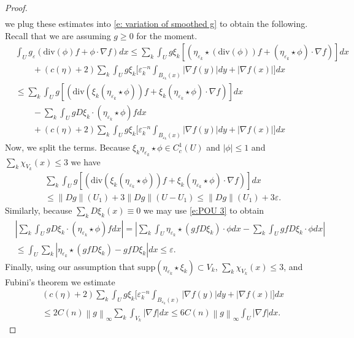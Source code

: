 \documentclass[12pt]{amsart}
\numberwithin{equation}{section}
\theoremstyle{plain}
\theoremstyle{definition}
\newcommand{\norm}[1]{\left\lVert#1\right\rVert}
\begin{document}
\begin{proof}
\begin{align*}
\end{align*}
we plug these estimates into \eqref{e: variation of smoothed g} to obtain the following. Recall that we are assuming $g \ge 0$ for the moment.
\begin{align*}
    & \int_{U} g_{\varepsilon}(\text{div}(\phi)f + \phi \cdot \nabla f)dx \le \sum_{k}\int_U g\xi_k[(\eta_{\varepsilon_k}\star (\text{div}(\phi))f + (\eta_{\varepsilon_k}\star \phi) \cdot \nabla f)]dx\\
    & \qquad + (c(\eta)+2) \sum_{k}\int_U g\xi_k\Big[\varepsilon_k^{-n}\int_{B_{\varepsilon_k}(x)} |\nabla f(y)|dy + |\nabla f(x)|\Big]dx\\
    & \le \sum_{k}\int_U g[(\text{div}(\xi_k (\eta_{\varepsilon_k}\star\phi))f + \xi_k(\eta_{\varepsilon_k}\star \phi) \cdot \nabla f)]dx\\
    & \qquad - \sum_{k}\int_U g D\xi_k \cdot (\eta_{\varepsilon_k} \star \phi)fdx\\
    & \qquad + (c(\eta)+2)\sum_{k}\int_U g\xi_k\Big[\varepsilon_k^{-n}\int_{B_{\varepsilon_k}(x)} |\nabla f(y)|dy + |\nabla f(x)|\Big]dx
\end{align*}
Now, we split the terms.  Because $\xi_k \eta_{\varepsilon_k} \star \phi \in C^{1}_c(U)$ and $|\phi|\le 1$ and $\sum_{k}\chi_{V_k}(x) \le 3$ we have
\begin{align*}
& \sum_{k}\int_U g[(\text{div}(\xi_k (\eta_{\varepsilon_k}\star\phi))f + \xi_k(\eta_{\varepsilon_k}\star \phi) \cdot \nabla f)]dx\\
    & \le \norm{Dg}(U_1) + 3\norm{Dg}(U-U_1) \le \norm{Dg}(U_1) + 3\varepsilon.
\end{align*}
Similarly, because $\sum_k D\xi_k(x) \equiv 0$ we may use \eqref{e:POU 3} to obtain
\begin{align*}
    & |\sum_{k}\int_U g D\xi_k \cdot (\eta_{\varepsilon_k} \star \phi)fdx| = |\sum_{k}\int_U \eta_{\varepsilon_k} \star (gf D\xi_k) \cdot \phi dx - \sum_{k}\int_U g fD\xi_k \cdot \phi dx|\\
    & \le  \int_U \sum_{k} |\eta_{\varepsilon_k} \star (gf D\xi_k) - gfD\xi_k| dx \le \varepsilon.
\end{align*}
Finally, using our assumption that $\text{supp}(\eta_{\varepsilon_k} \star \xi_k) \subset V_k$, $\sum_{k}\chi_{V_k}(x) \le 3$, and Fubini's theorem we estimate 
\begin{align*}
    & (c(\eta)+2)\sum_{k}\int_U g\xi_k\Big[\varepsilon_{k}^{-n}\int_{B_{\varepsilon_{k}}(x)}|\nabla f(y)|dy + |\nabla f(x)|\Big]dx\\
    & \le 2C(n)\norm{g}_{\infty} \sum_{k}\int_{V_k}|\nabla f|dx \le 6 C(n)\norm{g}_{\infty} \int_{U}|\nabla f|dx.
\end{align*}


\end{proof}
\end{document}
